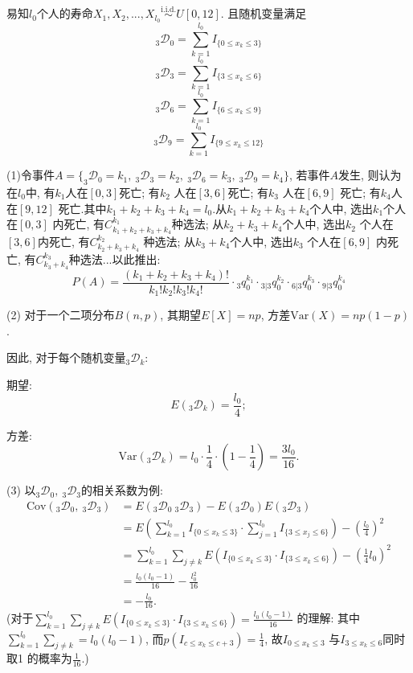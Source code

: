 \documentclass[a4paper,10pt]{ctexbook}
\begin{document}
\solution
易知$l_{0}$个人的寿命$X_{1},X_{2},...,X_{l_{0}}\stackrel{\text{i.i.d.}}{\sim}U[0,12]$. 且随机变量满足
$$_{3}\mathscr D _{0}=\sum^{l_{0}}_{k=1}I_{\{0\leq x_k \leq 3\}}$$
$$_{3}\mathscr D _{3}=\sum^{l_{0}}_{k=1}I_{\{3\leq x_k \leq 6\}}$$
$$_{3}\mathscr D _{6}=\sum^{l_{0}}_{k=1}I_{\{6\leq x_k \leq 9\}}$$
$$_{3}\mathscr D _{9}=\sum^{l_{0}}_{k=1}I_{\{9\leq x_k \leq 12\}}$$

(1)令事件$A=\{_{3}\mathscr D _{0}=k_{1},\ _{3}\mathscr D _{3}=k_{2},\ _{3}\mathscr D _{6}=k_{3},\ _{3}\mathscr D _{9}=k_{4}\}$, 若事件$A$发生, 则认为在$l_{0}$中, 有$k_{1}$人在$[0,3]$死亡; 有$k_{2}$ 人在$[3,6]$死亡; 有$k_{3}$ 人在$[6,9]$ 死亡; 有$k_{4}$人在$[9,12]$ 死亡.其中$k_{1}+k_{2}+k_{3}+k_{4}=l_{0}.$从$k_{1}+k_{2}+k_{3}+k_{4}$个人中, 选出$k_{1}$个人在$[0,3]$ 内死亡, 有$C_{k_{1}+k_{2}+k_{3}+k_{4}}^{k_{1}}$种选法; 从$k_{2}+k_{3}+k_{4}$个人中, 选出$k_{2}$ 个人在$[3,6]$内死亡, 有$C_{k_{2}+k_{3}+k_{4}}^{k_{2}}$ 种选法; 从$k_{3}+k_{4}$个人中, 选出$k_{3}$ 个人在$[6,9]$ 内死亡, 有$C_{k_{3}+k_{4}}^{k_{3}}$种选法...以此推出:
$$
    P(A)=\frac{(k_{1}+k_{2}+k_{3}+k_{4})!}{k_{1}!k_{2}!k_{3}!k_{4}!}\cdot {}_{3}q_{0}^{k_{1}}\cdot {}_{3|3}q_{0}^{k_{2}}\cdot {}_{6|3}q_{0}^{k_{3}}\cdot {}_{9|3}q_{0}^{k_{4}}
$$

(2) 对于一个二项分布$B(n, p)$, 其期望$E[X] = np$, 方差$\text{Var}(X) = np(1-p)$.

因此, 对于每个随机变量$_{3}\mathscr D_{k}$:

期望: $$E(_{3}\mathscr D_{k}) = \frac{l_0}{4};$$

方差: $$\text{Var}(_{3}\mathscr D_{k}) = l_0 \cdot \frac{1}{4} \cdot \left(1 - \frac{1}{4}\right) = \frac{3l_0}{16}.$$

(3) 以$_{3}\mathscr D _{0},\ _{3}\mathscr D _{3}$的相关系数为例:
\begin{align*}
    \text{Cov}(_{3}\mathscr D _{0},\ _{3}\mathscr D _{3}) & =E(_{3}\mathscr D _{0}\ _{3}\mathscr D _{3})-E(_{3}\mathscr D _{0})E(_{3}\mathscr D _{3})                                \\
                                                          & =E(\sum ^{l_{0}}_{k=1}I_{\{0\leq x_{k}\leq 3\}}\cdot \sum ^{l_{0}}_{j=1}I_{\{3\leq x_{j}\leq 6\}})-(\frac{l_{0}}{4})^{2} \\
                                                          & =\sum^{l_{0}}_{k=1}\sum_{j\neq k}E(I_{\{0\leq x_{k}\leq 3\}}\cdot I_{\{3\leq x_{k}\leq 6\}})-(\frac{1}{4}l_{0})^{2}      \\
                                                          & =\frac{l_{0}(l_{0}-1)}{16}-\frac{l_{0}^{2}}{16}                                                                          \\
                                                          & =-\frac{l_{0}}{16}.
\end{align*}
(对于$\sum^{l_{0}}_{k=1}\sum_{j\neq k}E(I_{\{0\leq x_{k}\leq 3\}}\cdot I_{\{3\leq x_{k}\leq 6\}}) = \frac{l_{0}(l_{0}-1)}{16}$ 的理解: 其中$\sum^{l_{0}}_{k=1}\sum_{j\neq k} = l_0(l_0-1)$, 而$p(I_{c\leq x_{k}\leq c+3}) = \frac14$, 故$I_{0\leq x_{k}\leq 3}$ 与$I_{3\leq x_{k}\leq 6}$同时取1 的概率为$\frac{1}{16}$.)
\end{document}
